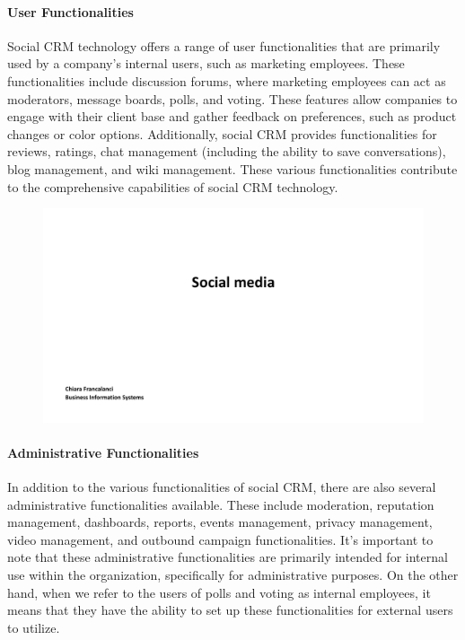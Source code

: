 \paragraph{User Functionalities}\label{user-functionalities}
Social CRM technology offers a range of user functionalities that are
primarily used by a company's internal users, such as marketing
employees. These functionalities include discussion forums, where
marketing employees can act as moderators, message boards, polls, and
voting. These features allow companies to engage with their client base
and gather feedback on preferences, such as product changes or color
options. Additionally, social CRM provides functionalities for reviews,
ratings, chat management (including the ability to save conversations),
blog management, and wiki management. These various functionalities
contribute to the comprehensive capabilities of social CRM technology.

\begin{figure}[!h]
  \centering
  \includegraphics[page=26, trim = 0cm 5.5cm 5cm 0.5cm, clip, width=\imagewidth]{images/04 - Social_Media.pdf}
\end{figure}

\paragraph{Administrative
  Functionalities}\label{administrative-functionalities}
In addition to the various functionalities of social CRM, there are also
several administrative functionalities available. These include
moderation, reputation management, dashboards, reports, events
management, privacy management, video management, and outbound campaign
functionalities. It's important to note that these administrative
functionalities are primarily intended for internal use within the
organization, specifically for administrative purposes. On the other
hand, when we refer to the users of polls and voting as internal
employees, it means that they have the ability to set up these
functionalities for external users to utilize.

